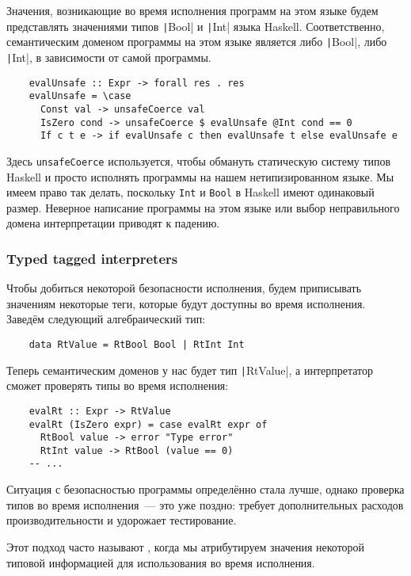 Значения, возникающие во время исполнения программ на этом языке будем представлять значениями типов \texttt|Bool| и \texttt|Int| языка Haskell.
Соответственно, семантическим доменом программы на этом языке является либо \texttt|Bool|, либо \texttt|Int|, в зависимости от самой программы.
\begin{verbatim}
    evalUnsafe :: Expr -> forall res . res
    evalUnsafe = \case
      Const val -> unsafeCoerce val
      IsZero cond -> unsafeCoerce $ evalUnsafe @Int cond == 0
      If c t e -> if evalUnsafe c then evalUnsafe t else evalUnsafe e
\end{verbatim}

Здесь \texttt{unsafeCoerce} используется, чтобы обмануть статическую систему типов Haskell и просто исполнять программы на нашем нетипизированном языке.
Мы имеем право так делать, поскольку \texttt{Int} и \texttt{Bool} в Haskell имеют одинаковый размер.
Неверное написание программы на этом языке или выбор неправильного домена интерпретации приводят к падению.

\subsubsection{Typed tagged interpreters}

Чтобы добиться некоторой безопасности исполнения, будем приписывать значениям некоторые теги, которые будут доступны во время исполнения.
Заведём следующий алгебраический тип:
\begin{verbatim}
    data RtValue = RtBool Bool | RtInt Int
\end{verbatim}

Теперь семантическим доменов у нас будет тип \texttt|RtValue|, а интерпретатор сможет проверять типы во время исполнения:
\begin{verbatim}
    evalRt :: Expr -> RtValue
    evalRt (IsZero expr) = case evalRt expr of
      RtBool value -> error "Type error"
      RtInt value -> RtBool (value == 0)
    -- ...
\end{verbatim}

Ситуация с безопасностью программы определённо стала лучше, однако проверка типов во время исполнения~--- это уже поздно: требует дополнительных расходов производительности и удорожает тестирование.

Этот подход часто называют , когда мы атрибутируем значения некоторой типовой информацией для использования во время исполнения.

